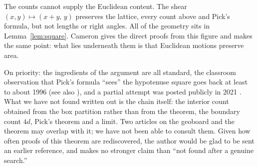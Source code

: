 \documentclass[11pt,a4paper]{article}
\theoremstyle{remark}
\begin{document}
The counts cannot supply the Euclidean content. The shear
$(x,y)\mapsto(x+y,\,y)$ preserves the lattice, every count above and Pick's
formula, but not lengths or right angles. All of the geometry sits in
Lemma~\ref{lem:square}. Cameron \cite{cameron} gives the direct proofs from this
figure and makes the same point: what lies underneath them is that Euclidean
motions preserve area.

On priority: the ingredients of the argument are all standard, the classroom
observation that Pick's formula ``sees'' the hypotenuse square goes back at least
to about 1996 \cite{chakerian} (see also \cite{mil}), and a partial attempt was
posted publicly in 2021 \cite{mse}. What we have not found written out is the
chain itself: the interior count obtained from the box partition rather than from
the theorem, the boundary count $4d$, Pick's theorem and a limit. Two articles
on the geoboard and the theorem \cite{ewbank, naraine} may overlap with it; we
have not been able to consult them. Given how often proofs of this theorem are
rediscovered, the author would be glad to be sent an earlier reference, and makes
no stronger claim than ``not found after a genuine search.''
\end{document}
